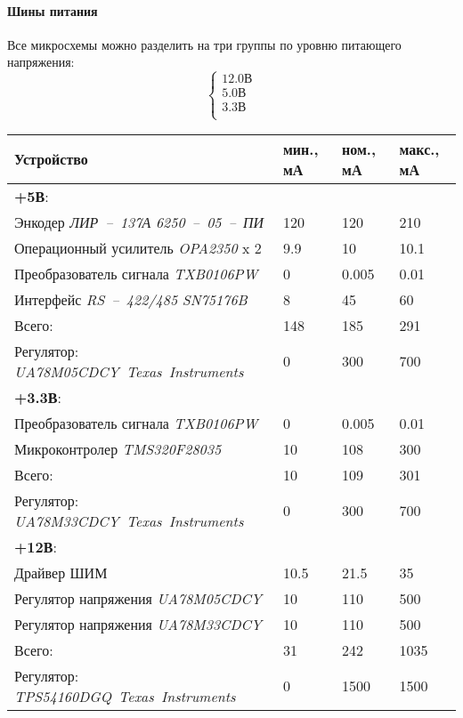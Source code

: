 \paragraph{Шины питания}
Все микросхемы можно разделить на три группы по уровню питающего напряжения:
$$
    \left\{
    \begin{aligned}
        12.0 \text{В} \\
        5.0  \text{В} \\
        3.3  \text{В} \\
    \end{aligned}
    \right.
$$

\begin{table}[ht!]
    \centering
    \begin{tabu}{|X[l,m]|X[-1,c,m]|X[-1,c,m]|X[-1,c,m]|}
        \hline
        Устройство & мин., мА & ном., мА  & макс., мА \\
        \hline \hline
        \textbf{+5В}: &&& \\
        Энкодер \textit{ЛИР~--~137А 6250~--~05~--~ПИ}  & 120 & 120   & 210  \\
        Операционный усилитель \textit{OPA2350} x 2    & 9.9 & 10    & 10.1 \\
        Преобразователь сигнала \textit{TXB0106PW}     & 0   & 0.005 & 0.01 \\
        Интерфейс \textit{RS~--~422/485 SN75176B}      & 8   & 45    & 60   \\
        \hline
        Всего: & 148 & 185 & 291 \\
        \hline
        Регулятор: \textit{
            \foreignlanguage{english}{UA78M05CDCY~Texas~Instruments}
        } & 0 & 300 & 700 \\

        \hline \hline
        \textbf{+3.3В}: &&& \\
        Преобразователь сигнала \textit{TXB0106PW} & 0  & 0.005 & 0.01 \\
        Микроконтролер \textit{TMS320F28035}       & 10 & 108   & 300  \\
        \hline
        Всего: & 10 & 109 & 301 \\
        \hline
        Регулятор: \textit{
            \foreignlanguage{english}{UA78M33CDCY~Texas~Instruments}
        } & 0 & 300 & 700 \\

        \hline \hline
        \textbf{+12В}: &&& \\
        Драйвер ШИМ                               & 10.5 & 21.5 & 35  \\
        Регулятор напряжения \textit{UA78M05CDCY} & 10   & 110  & 500 \\
        Регулятор напряжения \textit{UA78M33CDCY} & 10   & 110  & 500 \\
        \hline
        Всего: & 31 & 242 & 1035 \\
        \hline
        Регулятор: \textit{
            \foreignlanguage{english}{TPS54160DGQ~Texas~Instruments}
        } & 0 & 1500 & 1500 \\


\end{tabu}
\end{table}
